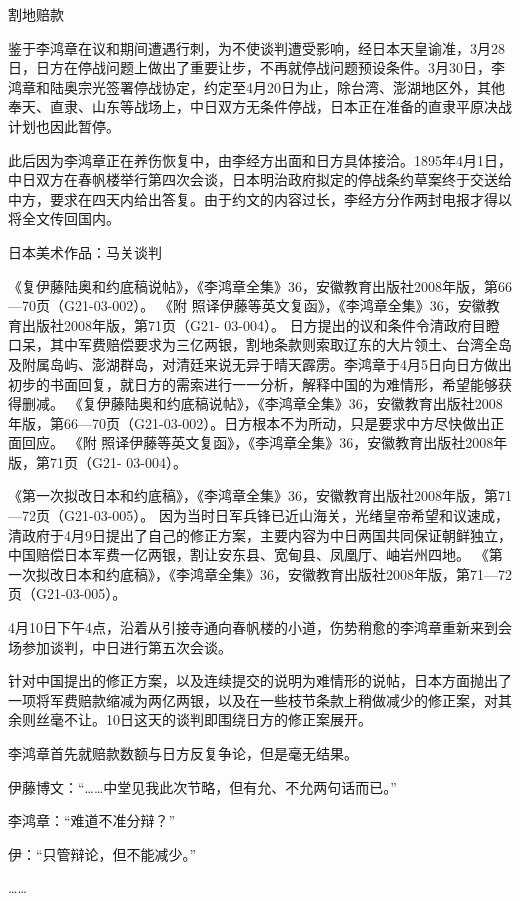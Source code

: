 \documentclass[12pt,UTF8]{ctexbook}
\begin{document}
割地赔款

鉴于李鸿章在议和期间遭遇行刺，为不使谈判遭受影响，经日本天皇谕准，3月28日，日方在停战问题上做出了重要让步，不再就停战问题预设条件。3月30日，李鸿章和陆奥宗光签署停战协定，约定至4月20日为止，除台湾、澎湖地区外，其他奉天、直隶、山东等战场上，中日双方无条件停战，日本正在准备的直隶平原决战计划也因此暂停。

此后因为李鸿章正在养伤恢复中，由李经方出面和日方具体接洽。1895年4月1日，中日双方在春帆楼举行第四次会谈，日本明治政府拟定的停战条约草案终于交送给中方，要求在四天内给出答复。由于约文的内容过长，李经方分作两封电报才得以将全文传回国内。


日本美术作品：马关谈判

《复伊藤陆奥和约底稿说帖》，《李鸿章全集》36，安徽教育出版社2008年版，第66—70页（G21-03-002）。
《附 照译伊藤等英文复函》，《李鸿章全集》36，安徽教育出版社2008年版，第71页（G21- 03-004）。
日方提出的议和条件令清政府目瞪口呆，其中军费赔偿要求为三亿两银，割地条款则索取辽东的大片领土、台湾全岛及附属岛屿、澎湖群岛，对清廷来说无异于晴天霹雳。李鸿章于4月5日向日方做出初步的书面回复，就日方的需索进行一一分析，解释中国的为难情形，希望能够获得删减。 《复伊藤陆奥和约底稿说帖》，《李鸿章全集》36，安徽教育出版社2008年版，第66—70页（G21-03-002）。日方根本不为所动，只是要求中方尽快做出正面回应。 《附 照译伊藤等英文复函》，《李鸿章全集》36，安徽教育出版社2008年版，第71页（G21- 03-004）。

《第一次拟改日本和约底稿》，《李鸿章全集》36，安徽教育出版社2008年版，第71—72页（G21-03-005）。
因为当时日军兵锋已近山海关，光绪皇帝希望和议速成，清政府于4月9日提出了自己的修正方案，主要内容为中日两国共同保证朝鲜独立，中国赔偿日本军费一亿两银，割让安东县、宽甸县、凤凰厅、岫岩州四地。 《第一次拟改日本和约底稿》，《李鸿章全集》36，安徽教育出版社2008年版，第71—72页（G21-03-005）。

4月10日下午4点，沿着从引接寺通向春帆楼的小道，伤势稍愈的李鸿章重新来到会场参加谈判，中日进行第五次会谈。

针对中国提出的修正方案，以及连续提交的说明为难情形的说帖，日本方面抛出了一项将军费赔款缩减为两亿两银，以及在一些枝节条款上稍做减少的修正案，对其余则丝毫不让。10日这天的谈判即围绕日方的修正案展开。

李鸿章首先就赔款数额与日方反复争论，但是毫无结果。

伊藤博文：“……中堂见我此次节略，但有允、不允两句话而已。”

李鸿章：“难道不准分辩？”

伊：“只管辩论，但不能减少。”

……
\end{document}
